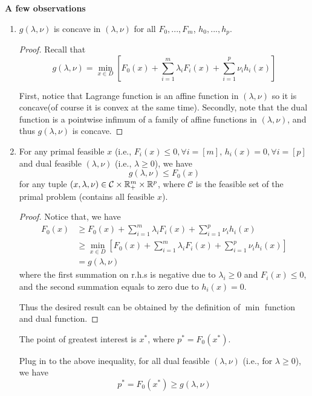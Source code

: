 \vspace{0.3cm}
\noindent\textbf{A few observations}
\begin{enumerate}
	
	\item $g(\lambda, \nu)$ is concave in $(\lambda, \nu)$ for all $F_0,...,F_m$, $h_0,...,h_p$.
	
	\begin{proof}
		Recall that
		$$g(\lambda, \nu) =\min_{x\in D}[F_0(x) + \sum^m_{i=1}\lambda_iF_i(x) + \sum^p_{i=1}\nu_ih_i(x) ]$$
		
		First, notice that Lagrange function is an affine function in $(\lambda, \nu)$ so it is concave(of course it is convex at the same time). Secondly, note that the dual function is a pointwise infimum of a family of affine functions in $(\lambda, \nu)$, and thus $g(\lambda, \nu)$ is concave.
	\end{proof}
	
	\item For any primal feasible $x$ (i.e., $F_i(x)\leq 0, \forall i = [m]$, $h_i(x)= 0,\forall i = [p]$ and dual feasible $(\lambda, \nu)$ (i.e., $\lambda \geq 0$), we have
	$$g(\lambda, \nu)\leq F_0(x)$$
	for any tuple $(x, \lambda, \nu) \in \mathcal{C}\times \mathbb{R}^m_+\times \mathbb{R}^p$, where $\mathcal{C}$ is the feasible set of the primal problem (contains all feasible $x$).
	
	\begin{proof}
		Notice that, we have
		\begin{align*}
			F_0(x) &\geq F_0(x) + \sum^m_{i=1}\lambda_iF_i(x) + \sum^p_{i=1}\nu_ih_i(x)\\
			&\geq \min_{x\in D} [F_0(x) + \sum^m_{i=1}\lambda_iF_i(x) + \sum^p_{i=1}\nu_ih_i(x)] \\
			&= g(\lambda, \nu)
		\end{align*}
		where the first summation on r.h.s is negative due to $\lambda_i\geq 0$ and $F_i(x)\leq 0$, and the second summation equals to zero due to $h_i(x)=0$. 
		
		Thus the desired result can be obtained by the definition of $\min$ function and dual function.
	\end{proof}
	
	The point of greatest interest is $x^*$, where $p^* = F_0(x^*)$.
	
	Plug in to the above inequality, for all dual feasible $(\lambda, \nu)$ (i.e., for $\lambda \geq 0$), we have
	\begin{equation*}
		p^* = F_0(x^*) \geq g(\lambda, \nu)
	\end{equation*}
	

\end{enumerate}
